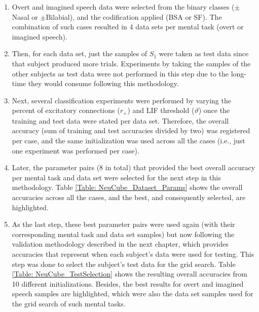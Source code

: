 \begin{enumerate}
	\item Overt and imagined speech data were selected from the binary classes ($\pm$Nasal or $\pm$Bilabial),  and the codification applied (BSA or SF). The combination of such cases resulted in 4 data sets per mental task (overt or imagined speech).
	\item Then, for each data set, just the samples of $S_{1}$ were taken as test data since that subject produced more trials. Experiments by taking the samples of the other subjects as test data were not performed in this step due to the long-time they would consume following this methodology.
	\item Next, several classification experiments were performed by varying the percent of excitatory connections ($r_{+}$) and LIF threshold ($\vartheta$) once the training and test data were stated per data set. Therefore, the overall accuracy (sum of training and test accuracies divided by two) was registered per case, and the same initialization was used across all the cases (i.e., just one experiment was performed per case).
	\item Later, the parameter pairs (8 in total) that provided the best overall accuracy per mental task and data set were selected for the next step in this methodology. Table \ref{Table: NeuCube_Dataset_Params} shows the overall accuracies across all the cases, and the best, and consequently selected, are highlighted.
	\item As the last step, these best parameter pairs were used again (with their corresponding mental task and data set samples) but now following the validation methodology described in the next chapter, which provides accuracies that represent when each subject's data were used for testing. This step was done to select the subject's test data for the grid search. Table \ref{Table: NeuCube_TestSelection} shows the resulting overall accuracies from 10 different initializations. Besides, the best results for overt and imagined speech samples are highlighted, which were also the data set samples used for the grid search of such mental tasks.
\end{enumerate}

